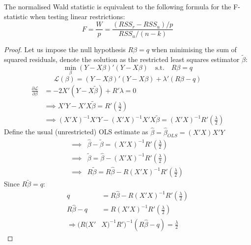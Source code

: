 \documentclass[DIV=14,titlepage=false]{scrreprt}
\begin{document}
\begin{prop}
    The normalised Wald statistic is equivalent to the following formula for the F-statistic when testing linear restrictions:
    \[ F=\frac{W}{p} = \frac{(RSS_r-RSS_u)/p}{RSS_u/(n-k)} \]
\end{prop}
\begin{proof}
Let us impose the null hypothesis $R\beta = q$ when minimising the sum of squared residuals, denote the solution as the restricted least squares estimator $\tilde{\beta}$:
\[ 
    \min_{\beta} (Y - X\beta)'(Y - X\beta) \quad \text{s.t.} \quad R\beta = q
\]
\[
    \mathcal{L}(\beta) = (Y - X\beta)'(Y - X\beta) + \lambda'(R\beta - q)    
\]
\begin{align*}
        \frac{\partial \mathcal{L}}{\partial \beta} &= -2X'(Y - X\tilde{\beta}) + R'\lambda = 0\\
         &\implies X'Y - X'X\tilde{\beta} = R'\left(\frac{\lambda}{2}\right)\\
         &\implies (X'X)^{-1}X'Y - (X'X)^{-1}X'X\tilde{\beta} = (X'X)^{-1} R'\left(\frac{\lambda}{2}\right)
\end{align*}
Define the usual (unrestricted) OLS estimate as $\hat\beta = \hat\beta_{OLS}= (X'X)X'Y$ 
\begin{align*}
\implies& \hat\beta - \tilde{\beta} = (X'X)^{-1} R'\left(\frac{\lambda}{2}\right)\\
\implies& \tilde{\beta} = \hat\beta - (X'X)^{-1}R'\left(\frac{\lambda}{2}\right)\\
\implies& R\tilde{\beta} = R\hat\beta - R(X'X)^{-1}R'\left(\frac{\lambda}{2}\right)
\end{align*}
Since \(R\tilde{\beta} = q\):
\begin{align*}
    q &= R\hat\beta - R(X'X)^{-1}R'\left(\frac{\lambda}{2}\right)\\
    R\hat\beta -q &= R(X'X)^{-1}R'\left(\frac{\lambda}{2}\right)\\
    \Rightarrow (R(X'&X)^{-1}R')^{-1}(R\hat{\beta} - q)=\frac{\lambda}{2} 
\end{align*}


\end{proof}
\end{document}
